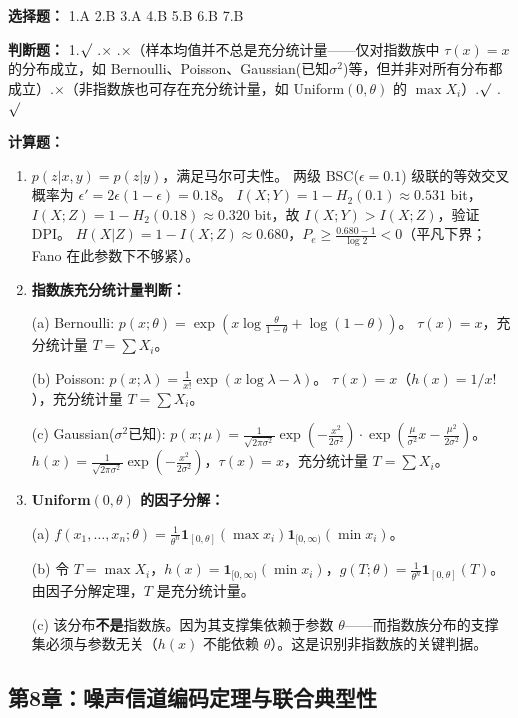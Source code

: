 \documentclass[12pt,a4paper]{ctexart}
\begin{document}
\textbf{选择题：} 1.A \quad 2.B \quad 3.A \quad 4.B \quad 5.B \quad 6.B \quad 7.B

\textbf{判断题：} 1.$\surd$ .$\times$ .$\times$（样本均值并不总是充分统计量——仅对指数族中 $\tau(x)=x$ 的分布成立，如 Bernoulli、Poisson、Gaussian(已知$\sigma^2$)等，但并非对所有分布都成立）.$\times$（非指数族也可存在充分统计量，如 Uniform$(0,\theta)$ 的 $\max X_i$）.$\surd$ .$\surd$

\textbf{计算题：}
\begin{enumerate}[leftmargin=*]
\item[(1)] $p(z|x,y)=p(z|y)$，满足马尔可夫性。
两级 BSC($\epsilon=0.1$) 级联的等效交叉概率为 $\epsilon'=2\epsilon(1-\epsilon)=0.18$。
$I(X;Y)=1-H_2(0.1)\approx0.531$ bit，$I(X;Z)=1-H_2(0.18)\approx0.320$ bit，故 $I(X;Y)>I(X;Z)$，验证 DPI。
$H(X|Z)=1-I(X;Z)\approx0.680$，$P_e\geq\frac{0.680-1}{\log 2}<0$（平凡下界；Fano 在此参数下不够紧）。

\item[(2)] \textbf{指数族充分统计量判断：}

(a) Bernoulli: $p(x;\theta)=\exp(x\log\frac{\theta}{1-\theta}+\log(1-\theta))$。
$\tau(x)=x$，充分统计量 $T=\sum X_i$。

(b) Poisson: $p(x;\lambda)=\frac{1}{x!}\exp(x\log\lambda-\lambda)$。
$\tau(x)=x$（$h(x)=1/x!$），充分统计量 $T=\sum X_i$。

(c) Gaussian($\sigma^2$已知): $p(x;\mu)=\frac{1}{\sqrt{2\pi\sigma^2}}\exp(-\frac{x^2}{2\sigma^2})\cdot\exp(\frac{\mu}{\sigma^2}x-\frac{\mu^2}{2\sigma^2})$。
$h(x)=\frac{1}{\sqrt{2\pi\sigma^2}}\exp(-\frac{x^2}{2\sigma^2})$，$\tau(x)=x$，充分统计量 $T=\sum X_i$。

\item[(3)] \textbf{Uniform$(0,\theta)$ 的因子分解：}

(a) $f(x_1,\ldots,x_n;\theta)=\frac{1}{\theta^n}\mathbf{1}_{[0,\theta]}(\max x_i)\mathbf{1}_{[0,\infty)}(\min x_i)$。

(b) 令 $T=\max X_i$，$h(x)=\mathbf{1}_{[0,\infty)}(\min x_i)$，$g(T;\theta)=\frac{1}{\theta^n}\mathbf{1}_{[0,\theta]}(T)$。
由因子分解定理，$T$ 是充分统计量。

(c) 该分布\textbf{不是}指数族。因为其支撑集依赖于参数 $\theta$——而指数族分布的支撑集必须与参数无关（$h(x)$ 不能依赖 $\theta$）。这是识别非指数族的关键判据。
\end{enumerate}

\subsection*{第8章：噪声信道编码定理与联合典型性}
\end{document}
